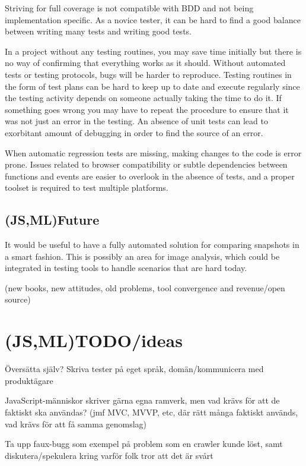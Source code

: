 \documentclass[11pt]{article}
\begin{document}
Striving for full coverage is not compatible with BDD and not being implementation specific. As a novice tester, it can be hard to find a good balance between writing many tests and writing good tests.

In a project without any testing routines, you may save time initially but there is no way of confirming that everything works as it should. Without automated tests or testing protocols, bugs will be harder to reproduce. Testing routines in the form of test plans can be hard to keep up to date and execute regularly since the testing activity depends on someone actually taking the time to do it. If something goes wrong you may have to repeat the procedure to ensure that it was not just an error in the testing. An absence of unit tests can lead to exorbitant amount of debugging in order to find the source of an error.

When automatic regression tests are missing, making changes to the code is error prone. Issues related to browser compatibility or subtle dependencies between functions and events are easier to overlook in the absence of tests, and a proper toolset is required to test multiple platforms.

\subsection{(JS,ML)Future}

It would be useful to have a fully automated solution for comparing snapshots in a smart fashion. This is possibly an area for image analysis, which could be integrated in testing tools to handle scenarios that are hard today.

(new books, new attitudes, old problems, tool convergence and revenue/open source)

\section{(JS,ML)TODO/ideas}

Översätta själv? Skriva tester på eget språk, domän/kommunicera med produktägare

JavaScript-människor skriver gärna egna ramverk, men vad krävs för att de faktiskt ska användas? (jmf MVC, MVVP, etc, där rätt många faktiskt används, vad krävs för att få samma genomslag)

Ta upp faux-bugg som exempel på problem som en crawler kunde löst, samt diskutera/spekulera kring varför folk tror att det är svårt
\end{document}
